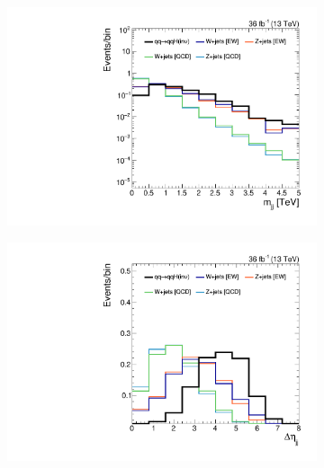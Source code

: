 \begin{figure}[]
    \begin{center}
        \begin{subfigure}[t]{0.32\textwidth}
            \includegraphics[width=\textwidth]{figures/vbf/shapes/loosesignal_jot12Mass_logy.pdf}
            \caption{\mjj}
        \end{subfigure}
        \begin{subfigure}[t]{0.32\textwidth}
            \includegraphics[width=\textwidth]{figures/vbf/shapes/loosesignal_jot12DEta.pdf}
            \caption{\deta}
        \end{subfigure}
        \begin{subfigure}[t]{0.32\textwidth}

\end{subfigure}
\end{center}
\end{figure}
